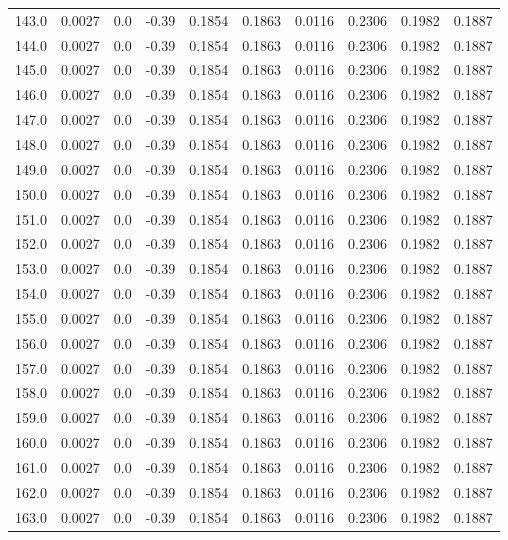 \begin{longtable}{lrrrrrrrrr}
143.0 & 0.0027 & 0.0 & -0.39 & 0.1854 & 0.1863 & 0.0116 & 0.2306 & 0.1982 & 0.1887 \\
144.0 & 0.0027 & 0.0 & -0.39 & 0.1854 & 0.1863 & 0.0116 & 0.2306 & 0.1982 & 0.1887 \\
145.0 & 0.0027 & 0.0 & -0.39 & 0.1854 & 0.1863 & 0.0116 & 0.2306 & 0.1982 & 0.1887 \\
146.0 & 0.0027 & 0.0 & -0.39 & 0.1854 & 0.1863 & 0.0116 & 0.2306 & 0.1982 & 0.1887 \\
147.0 & 0.0027 & 0.0 & -0.39 & 0.1854 & 0.1863 & 0.0116 & 0.2306 & 0.1982 & 0.1887 \\
148.0 & 0.0027 & 0.0 & -0.39 & 0.1854 & 0.1863 & 0.0116 & 0.2306 & 0.1982 & 0.1887 \\
149.0 & 0.0027 & 0.0 & -0.39 & 0.1854 & 0.1863 & 0.0116 & 0.2306 & 0.1982 & 0.1887 \\
150.0 & 0.0027 & 0.0 & -0.39 & 0.1854 & 0.1863 & 0.0116 & 0.2306 & 0.1982 & 0.1887 \\
151.0 & 0.0027 & 0.0 & -0.39 & 0.1854 & 0.1863 & 0.0116 & 0.2306 & 0.1982 & 0.1887 \\
152.0 & 0.0027 & 0.0 & -0.39 & 0.1854 & 0.1863 & 0.0116 & 0.2306 & 0.1982 & 0.1887 \\
153.0 & 0.0027 & 0.0 & -0.39 & 0.1854 & 0.1863 & 0.0116 & 0.2306 & 0.1982 & 0.1887 \\
154.0 & 0.0027 & 0.0 & -0.39 & 0.1854 & 0.1863 & 0.0116 & 0.2306 & 0.1982 & 0.1887 \\
155.0 & 0.0027 & 0.0 & -0.39 & 0.1854 & 0.1863 & 0.0116 & 0.2306 & 0.1982 & 0.1887 \\
156.0 & 0.0027 & 0.0 & -0.39 & 0.1854 & 0.1863 & 0.0116 & 0.2306 & 0.1982 & 0.1887 \\
157.0 & 0.0027 & 0.0 & -0.39 & 0.1854 & 0.1863 & 0.0116 & 0.2306 & 0.1982 & 0.1887 \\
158.0 & 0.0027 & 0.0 & -0.39 & 0.1854 & 0.1863 & 0.0116 & 0.2306 & 0.1982 & 0.1887 \\
159.0 & 0.0027 & 0.0 & -0.39 & 0.1854 & 0.1863 & 0.0116 & 0.2306 & 0.1982 & 0.1887 \\
160.0 & 0.0027 & 0.0 & -0.39 & 0.1854 & 0.1863 & 0.0116 & 0.2306 & 0.1982 & 0.1887 \\
161.0 & 0.0027 & 0.0 & -0.39 & 0.1854 & 0.1863 & 0.0116 & 0.2306 & 0.1982 & 0.1887 \\
162.0 & 0.0027 & 0.0 & -0.39 & 0.1854 & 0.1863 & 0.0116 & 0.2306 & 0.1982 & 0.1887 \\
163.0 & 0.0027 & 0.0 & -0.39 & 0.1854 & 0.1863 & 0.0116 & 0.2306 & 0.1982 & 0.1887 \\

\end{longtable}
